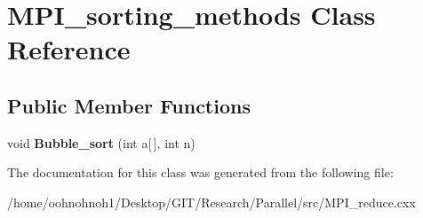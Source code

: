 \hypertarget{classMPI__sorting__methods}{}\section{M\+P\+I\+\_\+sorting\+\_\+methods Class Reference}
\label{classMPI__sorting__methods}
\subsection*{Public Member Functions}
\begin{DoxyCompactItemize}
\item 
\mbox{\label{classMPI__sorting__methods_a1cd738d8c9e6817b98680d4243d8d3c5}} 
void {\bfseries Bubble\+\_\+sort} (int a\mbox{[}$\,$\mbox{]}, int n)
\end{DoxyCompactItemize}


The documentation for this class was generated from the following file\+:\begin{DoxyCompactItemize}
\item 
/home/oohnohnoh1/\+Desktop/\+G\+I\+T/\+Research/\+Parallel/src/M\+P\+I\+\_\+reduce.\+cxx\end{DoxyCompactItemize}
